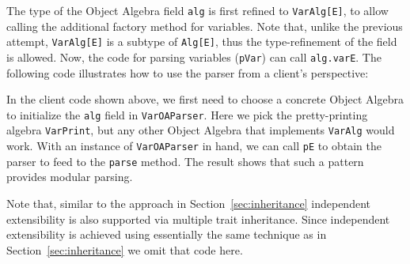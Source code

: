 
\noindent The type of the Object Algebra field \lstinline{alg} is first refined
to \lstinline{VarAlg[E]}, to allow calling the additional factory method
for variables. Note that, unlike the previous attempt, \lstinline{VarAlg[E]}
is a subtype of \lstinline{Alg[E]}, thus the type-refinement of the
field is allowed. Now, the code for parsing variables (\lstinline{pVar}) can
call \lstinline{alg.varE}. The following code illustrates how to use
the parser from a client's perspective:


In the client code shown above, we first need to choose a concrete
Object Algebra to initialize the \lstinline{alg} field in \lstinline{VarOAParser}. Here we pick the
pretty-printing algebra \lstinline{VarPrint}, but any other Object
Algebra that implements \lstinline{VarAlg} would work.
With an instance of \lstinline{VarOAParser} in hand, we can call
\lstinline{pE} to obtain the parser to feed to the \lstinline{parse} method.
The result shows that such a pattern provides modular parsing.

Note that, similar to the approach in Section~\ref{sec:inheritance} independent extensibility is also supported via multiple trait inheritance.
Since independent extensibility is achieved using essentially the same technique as in Section~\ref{sec:inheritance} we omit that code here.

